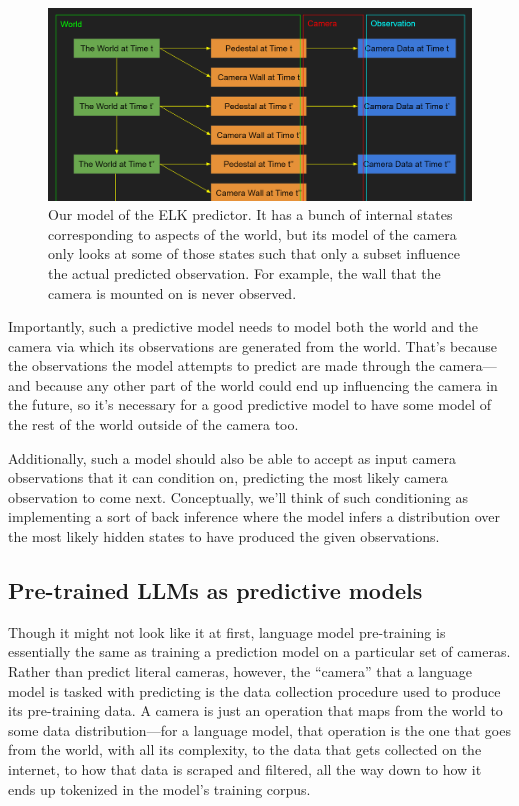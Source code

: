 \documentclass[
  onecolumn,
  natbib,
]{miri-tech-article}
\begin{document}
\begin{figure}[h!]
  \centering
  \includegraphics[width=\textwidth]{OTzdgch.png}
  \caption{Our model of the ELK predictor. It has a bunch of internal states corresponding to aspects of the world, but its model of the camera only looks at some of those states such that only a subset influence the actual predicted observation. For example, the wall that the camera is mounted on is never observed.}
\end{figure}

Importantly, such a predictive model needs to model both the world and the camera via which its observations are generated from the world. That's because the observations the model attempts to predict are made through the camera---and because any other part of the world could end up influencing the camera in the future, so it's necessary for a good predictive model to have some model of the rest of the world outside of the camera too.

Additionally, such a model should also be able to accept as input camera observations that it can condition on, predicting the most likely camera observation to come next. Conceptually, we'll think of such conditioning as implementing a sort of back inference where the model infers a distribution over the most likely hidden states to have produced the given observations.


\subsection{Pre-trained LLMs as predictive models}

Though it might not look like it at first, language model pre-training is essentially the same as training a prediction model on a particular set of cameras. Rather than predict literal cameras, however, the ``camera'' that a language model is tasked with predicting is the data collection procedure used to produce its pre-training data. A camera is just an operation that maps from the world to some data distribution---for a language model, that operation is the one that goes from the world, with all its complexity, to the data that gets collected on the internet, to how that data is scraped and filtered, all the way down to how it ends up tokenized in the model's training corpus.
\end{document}
